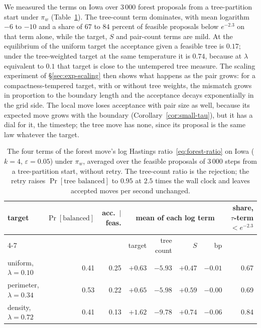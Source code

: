 \documentclass[11pt]{article}
\begin{document}
We measured the terms on Iowa over 3\,000 forest proposals from a
tree-partition start under $\pi_w$ (Table~\ref{tab:decomposition}).
The tree-count term dominates, with mean logarithm $-6$ to $-10$ and
a share of $67$ to $84$ percent of feasible proposals below $e^{-2.3}$
on that term alone, while the target, $S$ and pair-count terms are
mild. At the equilibrium of the uniform target the acceptance given a
feasible tree is $0.17$; under the tree-weighted target at the same
temperature it is $0.74$, because at $\lambda$ equivalent to $0.1$
that target is close to the untempered tree measure. The scaling
experiment of \S\ref{sec:exp-scaling} then shows what happens as the
pair grows: for a compactness-tempered target, with or without tree
weights, the mismatch grows in proportion to the boundary length and
the acceptance decays exponentially in the grid side. The local move
loses acceptance with pair size as well, because its expected move
grows with the boundary (Corollary~\ref{cor:small-tau}), but it has a
dial for it, the timestep; the tree move has none, since its proposal
is the same law whatever the target.

\begin{table}[htbp]
\centering
\footnotesize
\begin{tabular}{lrrrrrrr}
\toprule
target & $\Pr[\text{balanced}]$ & acc.\ $\mid$ feas. &
 \multicolumn{4}{c}{mean of each log term} & share, $\tau$-term $< e^{-2.3}$ \\
\cmidrule(lr){4-7}
 & & & target & tree count & $S$ & bp & \\
\midrule
uniform, $\lambda = 0.10$   & 0.41 & 0.25 & $+0.63$ & $-5.93$ & $+0.47$ & $-0.01$ & 0.67 \\
perimeter, $\lambda = 0.34$ & 0.53 & 0.22 & $+0.65$ & $-5.98$ & $+0.59$ & $-0.00$ & 0.69 \\
density, $\lambda = 0.72$   & 0.41 & 0.13 & $+1.62$ & $-9.78$ & $+0.74$ & $-0.06$ & 0.84 \\
\bottomrule
\end{tabular}
\caption{The four terms of the forest move's log Hastings
  ratio~\eqref{eq:forest-ratio} on Iowa ($k = 4$,
  $\varepsilon = 0.05$) under $\pi_w$, averaged over the feasible
  proposals of 3\,000 steps from a tree-partition start, without
  retry. The tree-count ratio is the rejection; the retry raises
  $\Pr[\text{tree balanced}]$ to $0.95$ at $2.5$ times the wall clock
  and leaves accepted moves per second unchanged.}\label{tab:decomposition}
\end{table}
\end{document}
